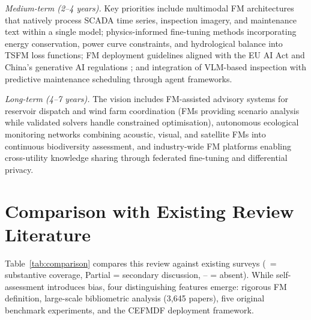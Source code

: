 \documentclass[preprint,12pt]{elsarticle}
\begin{document}
\textit{Medium-term (2--4 years).} Key priorities include multimodal FM architectures that natively process SCADA time series, inspection imagery, and maintenance text within a single model; physics-informed fine-tuning methods incorporating energy conservation, power curve constraints, and hydrological balance into TSFM loss functions; FM deployment guidelines aligned with the EU AI Act \cite{euaiact2024} and China's generative AI regulations \cite{china_genai_regulation2023}; and integration of VLM-based inspection with predictive maintenance scheduling through agent frameworks.

\textit{Long-term (4--7 years).} The vision includes FM-assisted advisory systems for reservoir dispatch and wind farm coordination (FMs providing scenario analysis while validated solvers handle constrained optimisation), autonomous ecological monitoring networks combining acoustic, visual, and satellite FMs into continuous biodiversity assessment, and industry-wide FM platforms enabling cross-utility knowledge sharing through federated fine-tuning and differential privacy.

\section{Comparison with Existing Review Literature}
\label{sec:comparison}

Table~\ref{tab:comparison} compares this review against existing surveys (\checkmark\ = substantive coverage, Partial = secondary discussion, -- = absent). While self-assessment introduces bias, four distinguishing features emerge: rigorous FM definition, large-scale bibliometric analysis (3{,}645 papers), five original benchmark experiments, and the CEFMDF deployment framework.
\end{document}
